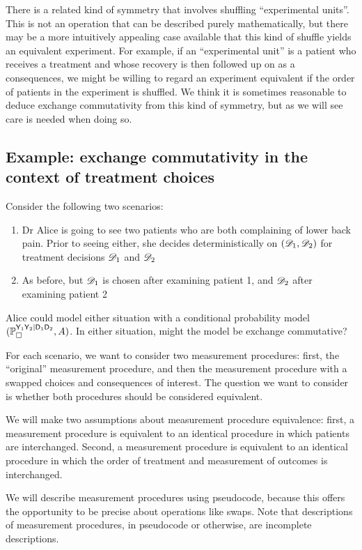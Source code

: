 There is a related kind of symmetry that involves shuffling ``experimental units''. This is not an operation that can be described purely mathematically, but there may be a more intuitively appealing case available that this kind of shuffle yields an equivalent experiment. For example, if an ``experimental unit'' is a patient who receives a treatment and whose recovery is then followed up on as a consequences, we might be willing to regard an experiment equivalent if the order of patients in the experiment is shuffled. We think it is sometimes reasonable to deduce exchange commutativity from this kind of symmetry, but as we will see care is needed when doing so.

\subsection{Example: exchange commutativity in the context of treatment choices}

Consider the following two scenarios:

\begin{enumerate}
    \item Dr Alice is going to see two patients who are both complaining of lower back pain. Prior to seeing either, she decides deterministically on $(\mathscr{D}_1,\mathscr{D}_2)$ for treatment decisions $\mathscr{D}_1$ and $\mathscr{D}_2$
    \item As before, but $\mathscr{D}_1$ is chosen after examining patient 1, and $\mathscr{D}_2$ after examining patient 2
\end{enumerate}

Alice could model either situation with a conditional probability model $(\mathbb{P}_\square^{\mathsf{Y}_1\mathsf{Y}_2|\mathsf{D}_1\mathsf{D}_2},A)$. In either situation, might the model be exchange commutative?

For each scenario, we want to consider two measurement procedures: first, the ``original'' measurement procedure, and then the measurement procedure with a swapped choices and consequences of interest. The question we want to consider is whether both procedures should be considered equivalent.

We will make two assumptions about measurement procedure equivalence: first, a measurement procedure is equivalent to an identical procedure in which patients are interchanged. Second, a measurement procedure is equivalent to an identical procedure in which the order of treatment and measurement of outcomes is interchanged.

We will describe measurement procedures using pseudocode, because this offers the opportunity to be precise about operations like swaps. Note that descriptions of measurement procedures, in pseudocode or otherwise, are incomplete descriptions.

